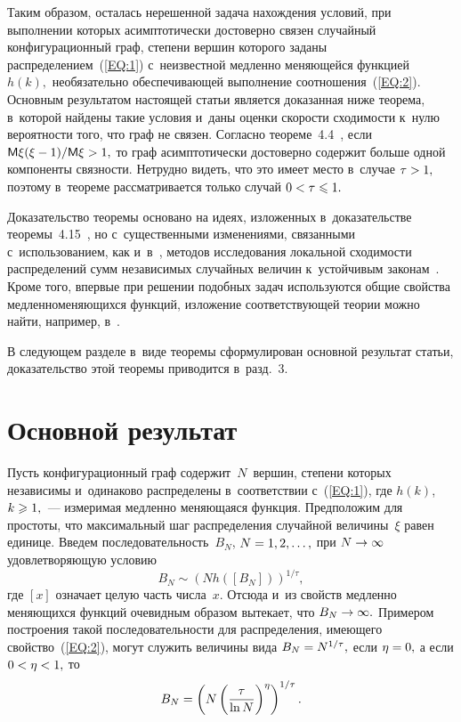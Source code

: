 \begin{multicols}{2}
Таким образом, осталась нерешенной задача нахождения условий, при выполнении которых 
асимптотически достоверно связен случайный конфигурационный граф, 
степени вершин которого заданы распределением~(\ref{EQ:1}) с~неизвестной медленно меняющейся функцией~$h(k),$ 
необязательно обеспечивающей выполнение соотношения~(\ref{EQ:2}). Основным результатом настоящей статьи 
является доказанная ниже тео\-ре\-ма, в~которой найдены такие условия и~даны оценки скорости сходимости 
к~нулю вероятности того, что граф не связен. 
Согласно теореме~4.4~\cite{Hof2}, если 
$\mathsf{M} \xi(\xi\hm-1)/\mathsf{M} \xi\hm >1,$ 
то граф асимптотически достоверно содержит больше одной компоненты связности. 
Нетрудно видеть, что это имеет место в~случае $\tau\hm >1,$ поэтому в~теореме 
рассматривается только случай $0\hm <\tau \hm\leqslant 1.$

Доказательство теоремы основано на идеях, изложенных в~доказательстве теоремы~4.15~\cite{Hof2}, но 
с~существенными изменениями, связанными с~использованием, как и~в~\cite{Pav2}, 
методов исследования локальной сходимости распределений сумм независимых случайных величин к~устойчивым 
законам~\cite{IL}. Кроме того, впервые при решении подобных задач используются общие свойства 
медленно\linebreak меняющихся функций, изложение со\-от\-вет\-ст\-ву\-ющей теории можно найти, например, в~\cite{Bin}.

В следующем разделе в~виде теоремы сформулирован основной результат статьи, доказательство 
этой теоремы приводится в~разд.~3.


\section{Основной результат}
\label{SC:2}

Пусть конфигурационный граф содержит~$N$~вершин, степени которых независимы и~одинаково 
распределены в~соответствии с~(\ref{EQ:1}), где $h(k)$, $k\hm\geqslant 1,$~--- 
измеримая медленно меняющаяся функция. Предположим для простоты, что максимальный шаг 
распределения случайной величины~$\xi$ равен единице. Введем последовательность~$B_N$, 
$N\hm=1,2,\ldots,$ при $N\hm\rightarrow \infty$ удовлетворяющую условию
\begin{equation}
\label{EQ:3}
B_N\sim \left(Nh\left([B_N]\right)\right)^{1/\tau},
\end{equation}
где $[x]$ означает целую часть числа~$x.$ Отсюда и~из свойств медленно меняющихся функций 
очевидным образом вытекает, что $B_N\hm\rightarrow \infty.$ Примером 
построения такой последовательности для распределения, имеющего свойство~(\ref{EQ:2}), 
могут служить величины вида $B_N\hm=N^{1/\tau},$ если $\eta\hm=0,$ а если $0\hm<\eta \hm<1,$ то
\begin{equation}
\label{EQ:4}
B_N=\left(N\left(\displaystyle\frac{\displaystyle \tau\mathstrut}{\displaystyle \ln N\mathstrut}\right)^\eta\right)^{1/\tau}.
\end{equation}


\end{multicols}
